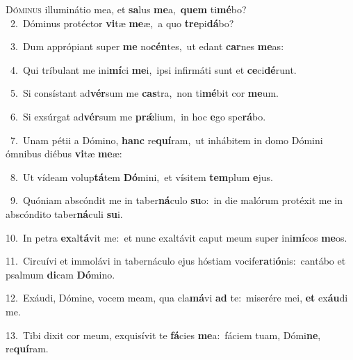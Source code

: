 \lettrine{\initial\textcolor{\initialcolor}{D}}{óminus} illuminátio mea, et \textbf{sa}\-lus \textbf{me}\-a,~\star \textbf{quem} ti\-\textbf{mé}\-bo?\\
{\numbfont\textcolor{\numbcolor}{~2.}}~Dóminus protéctor \textbf{vi}\-tæ \textbf{me}\-æ,~\star a quo \textbf{tre}\-pi\-\textbf{dá}\-bo?\par
{\numbfont\textcolor{\numbcolor}{~3.}}~Dum apprópiant super \textbf{me} no\-\textbf{cén}\-tes,~\star ut edant \textbf{car}\-nes \textbf{me}\-as:\par
{\numbfont\textcolor{\numbcolor}{~4.}}~Qui tríbulant me ini\-\textbf{mí}\-ci \textbf{me}\-i,~\star ipsi infirmáti sunt et \textbf{ce}\-ci\-\textbf{dé}\-runt.\par
{\numbfont\textcolor{\numbcolor}{~5.}}~Si consístant ad\-\textbf{vér}\-sum me \textbf{cas}\-tra,~\star non ti\-\textbf{mé}\-bit cor \textbf{me}\-um.\par
{\numbfont\textcolor{\numbcolor}{~6.}}~Si exsúrgat ad\-\textbf{vér}\-sum me \textbf{prǽ}\-lium,~\star in hoc \textbf{e}\-go spe\-\textbf{rá}\-bo.\par
{\numbfont\textcolor{\numbcolor}{~7.}}~Unam pétii a Dómino, \textbf{hanc} re\-\textbf{quí}\-ram,~\star ut inhábitem in domo Dómini ómnibus diébus \textbf{vi}\-tæ \textbf{me}\-æ:\par
{\numbfont\textcolor{\numbcolor}{~8.}}~Ut vídeam volup\-\textbf{tá}\-tem \textbf{Dó}\-mini,~\star et vísitem \textbf{tem}\-plum \textbf{e}\-jus.\par
{\numbfont\textcolor{\numbcolor}{~9.}}~Quóniam abscóndit me in taber\-\textbf{ná}\-culo \textbf{su}\-o:~\star in die malórum protéxit me in abscóndito taber\-\textbf{ná}\-culi \textbf{su}\-i.\par
{\numbfont\textcolor{\numbcolor}{10.}}~In petra \textbf{ex}\-al\-\textbf{tá}\-vit me:~\star et nunc exaltávit caput meum super ini\-\textbf{mí}\-cos \textbf{me}\-os.\par
{\numbfont\textcolor{\numbcolor}{11.}}~Circuívi et immolávi in tabernáculo ejus hóstiam vocife\-\textbf{ra}\-ti\-\textbf{ó}\-nis:~\star cantábo et psalmum \textbf{di}\-cam \textbf{Dó}\-mino.\par
{\numbfont\textcolor{\numbcolor}{12.}}~Exáudi, Dómine, vocem meam, qua cla\-\textbf{má}\-vi \textbf{ad} te:~\star miserére mei, \textbf{et} ex\-\textbf{áu}\-di me.\par
{\numbfont\textcolor{\numbcolor}{13.}}~Tibi dixit cor meum, exquisívit te \textbf{fá}\-cies \textbf{me}\-a:~\star fáciem tuam, Dómi\-\textbf{ne}\-, re\-\textbf{quí}\-ram.\par
